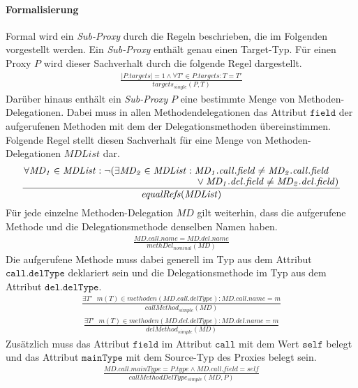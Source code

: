 \paragraph{Formalisierung}
Formal wird ein \emph{Sub-Proxy} durch die Regeln beschrieben, die im Folgenden vorgestellt werden. Ein \emph{Sub-Proxy} enthält genau einen Target-Typ. Für einen Proxy $P$ wird dieser Sachverhalt durch die folgende Regel dargestellt.
\begin{gather*}
\frac{|\mathit{P.targets}| = 1 \wedge \forall \mathit{T'} \in \mathit{P.targets}: T = T'}{\mathit{targets_{single}(P,T)}}
\end{gather*}
Darüber hinaus enthält ein \emph{Sub-Proxy} $P$ eine bestimmte Menge von Methoden-Delegationen. Dabei muss in allen Methodendelegationen das Attribut $\texttt{field}$ der aufgerufenen Methoden mit dem der Delegationsmethoden übereinstimmen. Folgende Regel stellt diesen Sachverhalt für eine Menge von Methoden-Delegationen $\mathit{MDList}$ dar.
\begin{gather*}
\frac{\splitfrac{\forall \mathit{MD_1}\in \mathit{MDList}: \neg(\exists \mathit{MD_2} \in \mathit{MDList}:\mathit{MD_1.call.field} \neq \mathit{MD_2.call.field}}{ \vee \mathit{MD_1.del.field} \neq \mathit{MD_2.del.field} )}}
{\mathit{equalRefs(MDList)}}
\end{gather*}
Für jede einzelne Methoden-Delegation $\mathit{MD}$ gilt weiterhin, dass die aufgerufene Methode und die Delegationsmethode denselben Namen haben.
\begin{gather*}
\frac{\mathit{MD.call.name} = \mathit{MD.del.name}}
{\mathit{methDel_{nominal}(MD)}}
\end{gather*}
Die aufgerufene Methode muss dabei generell im Typ aus dem Attribut $\texttt{call.delType}$ deklariert sein und die Delegationsmethode im Typ aus dem Attribut $\texttt{del.delType}$.
\begin{gather*}
\frac{\exists \mathit{T'\text{ } m(T)} \in \mathit{methoden(MD.call.delType)}: \mathit{MD.call.name} = m}
{\mathit{callMethod_{simple}(MD)}}
\end{gather*}
\begin{gather*}
\frac{\exists \mathit{T'\text{ }m(T)} \in \mathit{methoden(MD.del.delType)}: \mathit{MD.del.name} = m}
{\mathit{delMethod_{simple}(MD)}}
\end{gather*}
Zusätzlich muss das Attribut $\texttt{field}$ im Attribut $\texttt{call}$ mit dem Wert $\texttt{self}$ belegt und das Attribut $\texttt{mainType}$ mit dem Source-Typ des Proxies belegt sein.
\begin{gather*}
\frac{\mathit{MD.call.mainType} = \mathit{P.type} \wedge \mathit{MD.call.field} = \mathit{self}}
{\mathit{callMethodDelType_{simple}(MD, P)}}
\end{gather*}
